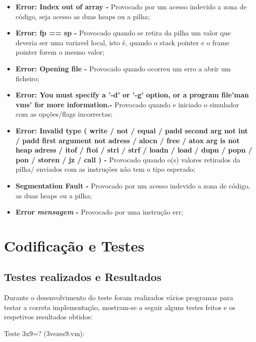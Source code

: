 \documentclass{report}
\begin{document}
\begin{itemize}
\item \textbf{Error: Index out of array - } Provocado por um acesso indevido a zona de código, seja acesso as duas heaps ou a pilha;
\item \textbf{Error: fp == sp - } Provocado quando se retira da pilha um valor que deveria ser uma variavel local, isto é, quando o stack pointer e o frame pointer forem o mesmo valor;
\item \textbf{Error: Opening file - } Provocado quando ocorreu um erro a abrir um ficheiro;
\item \textbf{Error: You must specify a '-d' or '-g' option, or a program file\nTry 'man vms' for more information.\n - } Provocado quando e iniciado o simulador
com as opções/flags incorrectas;
\item \textbf{Error: Invalid type ( write / not / equal / padd second arg not int / padd first argument not adress / alocn / free /
 atox arg is not heap adress / itof / ftoi / stri / strf / loadn / load / dupn / popn / pon / storen / jz / call ) - } Provocado
 quando o(s) valores retirados da pilha/ enviados com as instruções não tem o tipo esperado;
\item \textbf{Segmentation Fault - } Provocado por um acesso indevido a zona de código, as duas heaps ou a pilha;
\item \textbf{Error \textit{mensagem} - } Provocado por uma instrução err;
\end{itemize}

\chapter{Codificação e Testes}

\section{Testes realizados e Resultados}
Durante o desenvolvimento do teste foram realizados vários programas para testar a correta implementação, mostram-se
a seguir alguns testes feitos e os respetivos resultados obtidos:\\







\noindent
\par
\begin{Parallel}[v]{0.48\textwidth}{0.48\textwidth}

\quad Teste 3x9=? (3vezes9.vm):
\ParallelPar
\end{Parallel}
\end{document}
